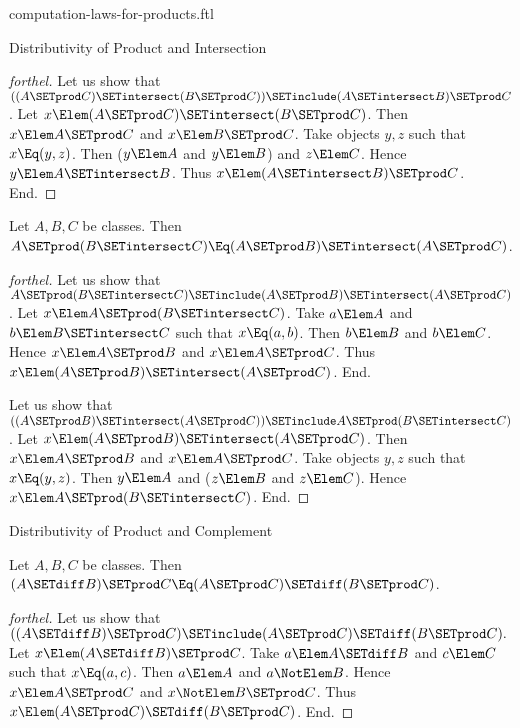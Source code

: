 \documentclass{stex}
\begin{document}
\begin{smodule}{computation-laws-for-products.ftl}
\begin{sfragment}{Distributivity of Product and Intersection}
\begin{proof}[forthel]
    Let us show that $((A \SETprod C) \SETintersect (B \SETprod C)) \SETinclude (A \SETintersect B) \SETprod C$. %
      Let $x \Elem (A \SETprod C) \SETintersect (B \SETprod C)$.
      Then $x \Elem A \SETprod C$ and $x \Elem B \SETprod C$.
      Take objects $y, z$ such that $x \Eq (y, z)$.
      Then ($y \Elem A$ and $y \Elem B$) and $z \Elem C$.
      Hence $y \Elem A \SETintersect B$.
      Thus $x \Elem (A \SETintersect B) \SETprod C$.
    End.
  \end{proof}

  \begin{proposition}[forthel]
    Let $A, B, C$ be classes.
    Then $A \SETprod (B \SETintersect C) \Eq (A \SETprod B) \SETintersect (A \SETprod C)$.
  \end{proposition}
  \begin{proof}[forthel]
    Let us show that $A \SETprod (B \SETintersect C) \SETinclude (A \SETprod B) \SETintersect (A \SETprod C)$.
      Let $x \Elem A \SETprod (B \SETintersect C)$.
      Take $a \Elem A$ and $b \Elem B \SETintersect C$ such that $x \Eq (a, b)$.
      Then $b \Elem B$ and $b \Elem C$.
      Hence $x \Elem A \SETprod B$ and $x \Elem A \SETprod C$.
      Thus $x \Elem (A \SETprod B) \SETintersect (A \SETprod C)$.
    End.

    Let us show that $((A \SETprod B) \SETintersect (A \SETprod C)) \SETinclude A \SETprod (B \SETintersect C)$. %
      Let $x \Elem (A \SETprod B) \SETintersect (A \SETprod C)$.
      Then $x \Elem A \SETprod B$ and $x \Elem A \SETprod C$.
      Take objects $y, z$ such that $x \Eq (y, z)$.
      Then $y \Elem A$ and ($z \Elem B$ and $z \Elem C$).
      Hence $x \Elem A \SETprod (B \SETintersect C)$.
    End.
  \end{proof}
\end{sfragment}

\begin{sfragment}{Distributivity of Product and Complement}
  \begin{proposition}[forthel]
    Let $A, B, C$ be classes.
    Then $(A \SETdiff B) \SETprod C \Eq (A \SETprod C) \SETdiff (B \SETprod C)$.
  \end{proposition}
  \begin{proof}[forthel]
    Let us show that $((A \SETdiff B) \SETprod C) \SETinclude (A \SETprod C) \SETdiff (B \SETprod C).$ %
      Let $x \Elem (A \SETdiff B) \SETprod C$.
      Take $a \Elem A \SETdiff B$ and $c \Elem C$ such that $x \Eq (a, c)$.
      Then $a \Elem A$ and $a \NotElem B$.
      Hence $x \Elem A \SETprod C$ and $x \NotElem B \SETprod C$.
      Thus $x \Elem (A \SETprod C) \SETdiff (B \SETprod C)$.
    End.


\end{proof}
\end{sfragment}
\end{smodule}
\end{document}
